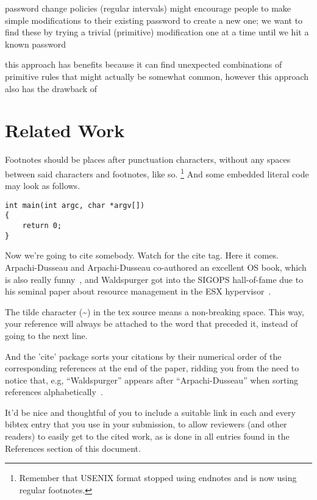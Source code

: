 \documentclass[letterpaper,twocolumn,10pt]{article}
\begin{document}
password change policies (regular intervals) might encourage people to make
simple modifications to their existing password to create a new one; we want
to find these by trying a trivial (primitive) modification one at a time until
we hit a known password

this approach has benefits because it can find unexpected combinations of
primitive rules that might actually be somewhat common, however this approach
also has the drawback of

\section{Related Work}

Footnotes should be places after punctuation characters, without any
spaces between said characters and footnotes, like so.%
\footnote{Remember that USENIX format stopped using endnotes and is
  now using regular footnotes.} And some embedded literal code may
look as follows.

\begin{verbatim}
int main(int argc, char *argv[]) 
{
    return 0;
}
\end{verbatim}

Now we're going to cite somebody. Watch for the cite tag. Here it
comes. Arpachi-Dusseau and Arpachi-Dusseau co-authored an excellent OS
book, which is also really funny~\cite{arpachiDusseau18:osbook}, and
Waldspurger got into the SIGOPS hall-of-fame due to his seminal paper
about resource management in the ESX hypervisor~\cite{waldspurger02}.

The tilde character (\~{}) in the tex source means a non-breaking
space. This way, your reference will always be attached to the word
that preceded it, instead of going to the next line.

And the 'cite' package sorts your citations by their numerical order
of the corresponding references at the end of the paper, ridding you
from the need to notice that, e.g, ``Waldspurger'' appears after
``Arpachi-Dusseau'' when sorting references
alphabetically~\cite{waldspurger02,arpachiDusseau18:osbook}. 

It'd be nice and thoughtful of you to include a suitable link in each
and every bibtex entry that you use in your submission, to allow
reviewers (and other readers) to easily get to the cited work, as is
done in all entries found in the References section of this document.
\end{document}
